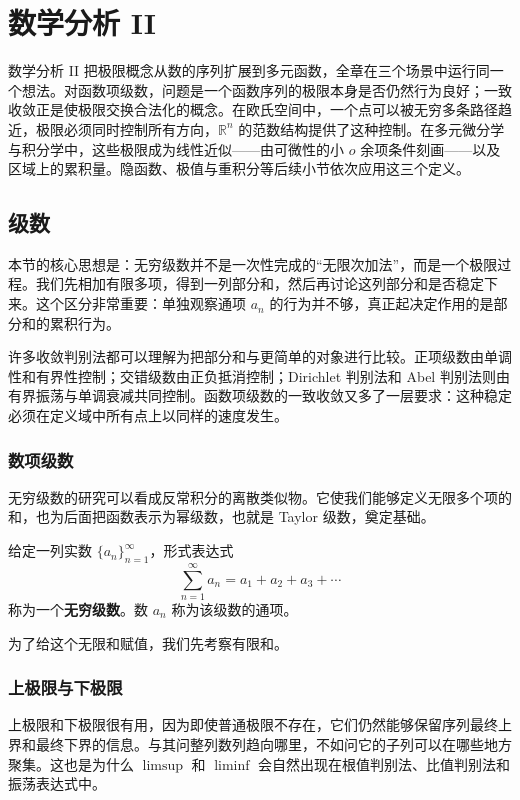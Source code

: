 \chapter{数学分析 II}

数学分析 II 把极限概念从数的序列扩展到多元函数，全章在三个场景中运行同一个想法。对函数项级数，问题是一个函数序列的极限本身是否仍然行为良好；一致收敛正是使极限交换合法化的概念。在欧氏空间中，一个点可以被无穷多条路径趋近，极限必须同时控制所有方向，$\mathbb{R}^n$ 的范数结构提供了这种控制。在多元微分学与积分学中，这些极限成为线性近似——由可微性的小 $o$ 余项条件刻画——以及区域上的累积量。隐函数、极值与重积分等后续小节依次应用这三个定义。

\section{级数}

本节的核心思想是：无穷级数并不是一次性完成的“无限次加法”，而是一个极限过程。我们先相加有限多项，得到一列部分和，然后再讨论这列部分和是否稳定下来。这个区分非常重要：单独观察通项 $a_n$ 的行为并不够，真正起决定作用的是部分和的累积行为。

许多收敛判别法都可以理解为把部分和与更简单的对象进行比较。正项级数由单调性和有界性控制；交错级数由正负抵消控制；Dirichlet 判别法和 Abel 判别法则由有界振荡与单调衰减共同控制。函数项级数的一致收敛又多了一层要求：这种稳定必须在定义域中所有点上以同样的速度发生。

\subsection{数项级数}

无穷级数的研究可以看成反常积分的离散类似物。它使我们能够定义无限多个项的和，也为后面把函数表示为幂级数，也就是 Taylor 级数，奠定基础。

\begin{definition}[无穷级数]
给定一列实数 $\{a_n\}_{n=1}^{\infty}$，形式表达式
\[
    \sum_{n=1}^{\infty}a_n=a_1+a_2+a_3+\cdots
\]
称为一个\textbf{无穷级数}。数 $a_n$ 称为该级数的通项。
\end{definition}

为了给这个无限和赋值，我们先考察有限和。

\subsection{上极限与下极限}

上极限和下极限很有用，因为即使普通极限不存在，它们仍然能够保留序列最终上界和最终下界的信息。与其问整列数列趋向哪里，不如问它的子列可以在哪些地方聚集。这也是为什么 $\limsup$ 和 $\liminf$ 会自然出现在根值判别法、比值判别法和振荡表达式中。

